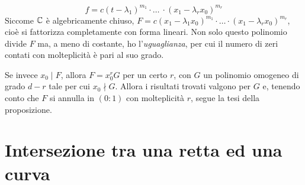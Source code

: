 \begin{demonstration}
\begin{enumerate}[label=\Roman*]
\begin{equation*}
				f=c(t-\lambda_1)^{m_1}\cdot \ldots\ \cdot (x_1-\lambda_r x_0)^{m_r}
			\end{equation*}
			Siccome $\mathbb{C}$ è algebricamente chiuso, $F=c(x_1-\lambda_1x_0)^{m_1}\cdot \ldots\cdot (x_1-\lambda_rx_0)^{m_r}$, cioè si fattorizza completamente con forma lineari. Non solo questo polinomio divide $F$ ma, a meno di costante, ho l'\textit{uguaglianza}, per cui il numero di zeri contati con molteplicità è pari al suo grado.
		\end{enumerate}
	Se invece $x_0\mid F$, allora $F=x_0^r G$ per un certo $r$, con $G$ un polinomio omogeneo di grado $d-r$ tale per cui $x_0\nmid G$. Allora i risultati trovati valgono per $G$ e, tenendo conto che $F$ si annulla in $(0\colon 1)$ con molteplicità $r$, segue la tesi della proposizione.
\end{demonstration}
\section{Intersezione tra una retta ed una curva}
